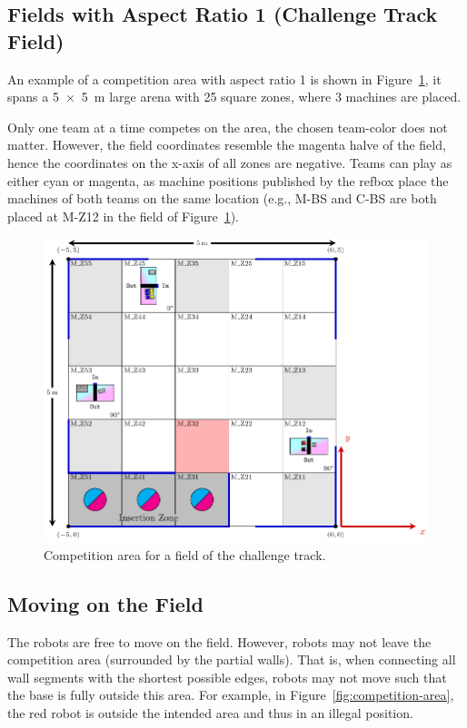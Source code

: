 \documentclass[12pt,twoside]{article}
\newcommand{\reffig}[1]{Figure~\ref{#1}}
\begin{document}
\subsection{Fields with Aspect Ratio 1 (Challenge Track Field)}
\label{sec:competition-area-aspect-ratio-1}
An example of a competition area with aspect ratio 1 is shown in
\reffig{fig:competition-area-challenges},
it spans a \SI{5 x 5}{\metre} large %
arena with 25 square zones, where 3 machines are placed.

Only one team at a time competes on the area, the chosen team-color
does not matter. However, the field coordinates resemble the magenta halve
of the field, hence the coordinates on the x-axis of all zones are negative.
Teams can play as either cyan or magenta, as machine positions published by
the \ac{refbox} place the machines of both teams on the same location
(e.g., M-BS and C-BS are both placed at M-Z12 in the field of
\reffig{fig:competition-area-challenges}).

\begin{figure}[!ht]
    \includegraphics{challenge-field2021.pdf}
    \vspace{1ex}
    \caption{%
      Competition area for a field of the challenge track.
    }
    \label{fig:competition-area-challenges}
\end{figure}


\subsection{Moving on the Field}
\label{sec:field-movement}
The robots are free to move on the field. However, robots may not
leave the competition area (surrounded by the partial walls). That is, when
connecting all wall segments with the shortest possible edges, robots
may not move such that the base is fully outside this area. For
example, in \reffig{fig:competition-area}, the red robot is outside
the intended area and thus in an illegal position.
\end{document}
